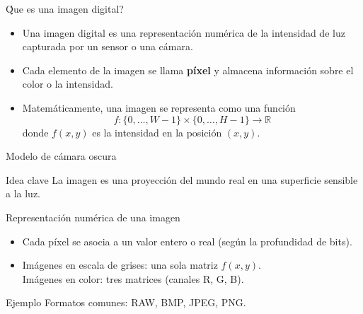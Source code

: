 \documentclass[10pt]{beamer}
\begin{document}
\begin{frame}{\'Que es una imagen digital?}
\begin{itemize}
  \item Una imagen digital es una representaci\'on num\'erica de la intensidad de luz capturada por un sensor o una c\'amara.
  \item Cada elemento de la imagen se llama \textbf{p\'ixel} y almacena informaci\'on sobre el color o la intensidad.
  \item Matem\'aticamente, una imagen se representa como una funci\'on
  $$f: \{0,\ldots,W-1\}\times\{0,\ldots,H-1\}\to\mathbb{R}$$
  donde $f(x,y)$ es la intensidad en la posici\'on $(x,y)$.
\end{itemize}
\end{frame}

\begin{frame}{Modelo de c\'amara oscura}
\centering
{}
\vspace{2mm}
\begin{block}{Idea clave}
La imagen es una proyecci\'on del mundo real en una superficie sensible a la luz.
\end{block}
\end{frame}

\begin{frame}{Representaci\'on num\'erica de una imagen}
\begin{itemize}
  \item Cada p\'ixel se asocia a un valor entero o real (seg\'un la profundidad de bits).
  \item Im\'agenes en escala de grises: una sola matriz $f(x,y)$. \\
  Im\'agenes en color: tres matrices (canales R, G, B).
\end{itemize}
\begin{block}{Ejemplo}
Formatos comunes: RAW, BMP, JPEG, PNG.
\end{block}
\end{frame}
\end{document}
